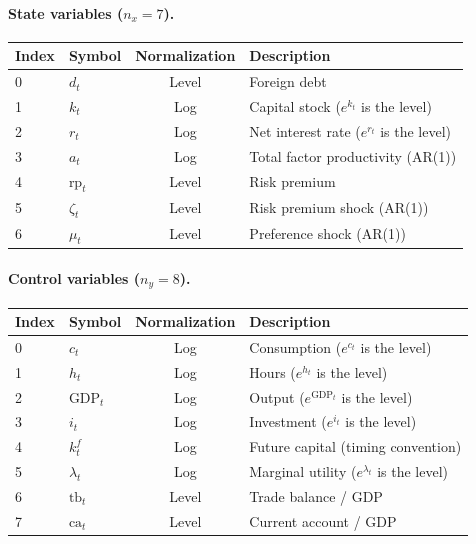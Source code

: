 \documentclass[11pt,a4paper]{article}
\theoremstyle{definition}
\begin{document}
	\paragraph{State variables ($n_x = 7$).}
	\begin{center}
	\begin{tabular}{llcl}
		\toprule
		\textbf{Index} & \textbf{Symbol} & \textbf{Normalization} & \textbf{Description} \\
		\midrule
		0 & $d_t$          & Level     & Foreign debt \\
		1 & $k_t$          & Log       & Capital stock ($e^{k_t}$ is the level) \\
		2 & $r_t$          & Log       & Net interest rate ($e^{r_t}$ is the level) \\
		3 & $a_t$          & Log       & Total factor productivity (AR(1)) \\
		4 & $\text{rp}_t$  & Level     & Risk premium \\
		5 & $\zeta_t$      & Level     & Risk premium shock (AR(1)) \\
		6 & $\mu_t$        & Level     & Preference shock (AR(1)) \\
		\bottomrule
	\end{tabular}
	\end{center}

	\paragraph{Control variables ($n_y = 8$).}
	\begin{center}
	\begin{tabular}{llcl}
		\toprule
		\textbf{Index} & \textbf{Symbol} & \textbf{Normalization} & \textbf{Description} \\
		\midrule
		0 & $c_t$        & Log   & Consumption ($e^{c_t}$ is the level) \\
		1 & $h_t$        & Log   & Hours ($e^{h_t}$ is the level) \\
		2 & $\text{GDP}_t$ & Log & Output ($e^{\text{GDP}_t}$ is the level) \\
		3 & $i_t$        & Log   & Investment ($e^{i_t}$ is the level) \\
		4 & $k^f_t$      & Log   & Future capital (timing convention) \\
		5 & $\lambda_t$  & Log   & Marginal utility ($e^{\lambda_t}$ is the level) \\
		6 & $\text{tb}_t$ & Level & Trade balance / GDP \\
		7 & $\text{ca}_t$ & Level & Current account / GDP \\
		\bottomrule
	\end{tabular}
	\end{center}
\end{document}
